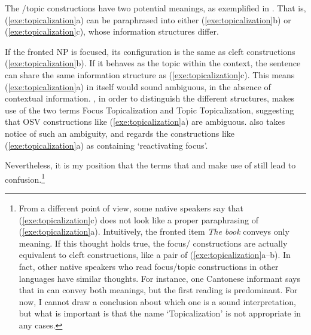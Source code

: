 The /topic  constructions have two potential meanings, as
exemplified in . That is,
(\ref{exe:topicalization}a) can be paraphrased into either
(\ref{exe:topicalization}b) or (\ref{exe:topicalization}c), whose
information structures differ.




\noindent If the fronted NP is focused, its configuration is the same
as cleft constructions (\ref{exe:topicalization}b). If it behaves as
the topic within the context, the sentence can share the same
information structure as (\ref{exe:topicalization}c).  This means
(\ref{exe:topicalization}a) in itself would sound ambiguous, in the
absence of contextual information.  \citet{gundel:83}, in order to
distinguish the different structures, makes use of the two terms Focus
Topicalization and Topic Topicalization, suggesting that OSV
constructions like (\ref{exe:topicalization}a) are
ambiguous. \citet{gussenhoven:07} also takes notice of such an
ambiguity, and regards the constructions like
(\ref{exe:topicalization}a) as containing `reactivating focus'.







\noindent Nevertheless, it is my position that the terms that
\citeauthor{gundel:83} and \citeauthor{gussenhoven:07} make use of
still lead to confusion.\footnote{From a different point of view, some
   native speakers say that (\ref{exe:topicalization}c)
  does not look like a proper paraphrasing of
  (\ref{exe:topicalization}a). Intuitively, the fronted
  item \textit{The book} conveys only  meaning.  If this
  thought holds true, the focus/ 
  constructions are actually equivalent to cleft constructions, like a
  pair of (\ref{exe:topicalization}a--b).  In fact, other native
  speakers who read focus/topic constructions in other languages have
  similar thoughts. For instance, one Cantonese informant says that
   in  can convey both
  meanings, but the first reading is predominant.  For now, I cannot
  draw a conclusion about which one is a sound interpretation, but
  what is important is that the name `Topicalization' is not
  appropriate in any cases.}


